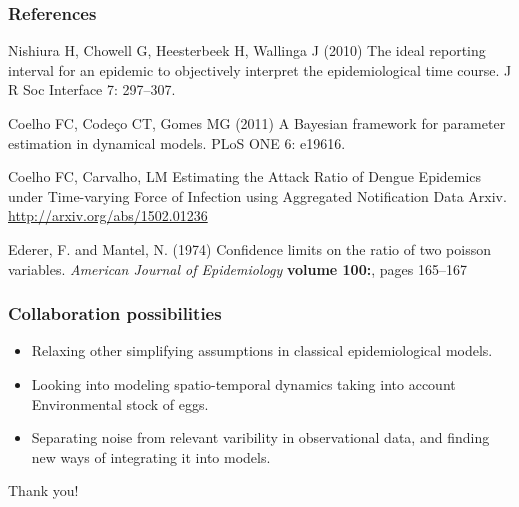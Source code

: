 \documentclass[10pt,compress,notheorems]{beamer}
\begin{document}
\begin{frame}[fragile]
\frametitle{References}
\begin{thebibliography}{10}
Nishiura H, Chowell G, Heesterbeek H, Wallinga J (2010) {{T}he ideal reporting
  interval for an epidemic to objectively interpret the epidemiological time
  course}.
\newblock J R Soc Interface 7: 297--307.

Coelho FC, Code\c{c}o CT, Gomes MG (2011) {A} {B}ayesian framework for
  parameter estimation in dynamical models.
\newblock PLoS ONE 6: e19616.

Coelho FC, Carvalho, LM {E}stimating the Attack Ratio of Dengue 
Epidemics under Time-varying Force of Infection using Aggregated Notification 
Data
\newblock Arxiv. \url{http://arxiv.org/abs/1502.01236}

Ederer, F. and Mantel, N. (1974)
\newblock Confidence limits on the ratio of two poisson
  variables.
\newblock \emph{American Journal of Epidemiology}
  \textbf{volume 100:}, pages 165--167

\end{thebibliography}

\end{frame}
\begin{frame}
 \frametitle{Collaboration possibilities}
 \begin{itemize}
  \item Relaxing other simplifying assumptions in classical epidemiological 
models.
\item Looking into modeling spatio-temporal dynamics taking into account 
Environmental stock of eggs.
\item Separating noise from relevant varibility in observational data, and 
finding new ways of integrating it into models.
 \end{itemize}


\end{frame}
\begin{frame}
  
 \begin{center}
\begin{Huge}Thank you!           \end{Huge} \end{center}
\end{frame}
\end{document}

